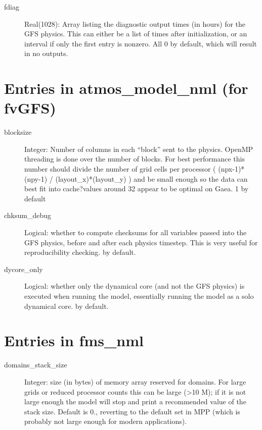 \documentclass[12pt,letterpaper]{book}
\begin{document}
\begin{description}

\item[fdiag] Real(1028): Array listing the diagnostic output times (in hours) for the GFS physics. This can either be a list of times after initialization, or an interval if only the first entry is nonzero. All 0 by default, which will result in no outputs. 

\end{description}

\section{Entries in atmos\_model\_nml (for fvGFS)}

\begin{description}

\item[blocksize] Integer: Number of columns in each ``block'' sent to the physics. OpenMP threading is done over the number of blocks. For best performance this number should divide the number of grid cells per processor ( (npx-1)*(npy-1) / (layout\_x)*(layout\_y) ) and be small enough so the data can best fit into cache?values around 32 appear to be optimal on Gaea. 1 by default

\item[chksum\_debug] Logical: whether to compute checksums for all variables passed into the GFS physics, before and after each physics timestep. This is very useful for reproducibility checking. \false  by default.

\item[dycore\_only] Logical: whether only the dynamical core (and not the GFS physics) is executed when running the model, essentially running the model as a solo dynamical core. \false  by default.

\end{description}


\section{Entries in fms\_nml}

\begin{description}

\item[domains\_stack\_size] Integer: size (in bytes) of memory array reserved for domains. For large grids or reduced processor counts this can be large (>10 M); if it is not large enough the model will stop and print a recommended value of the stack size. Default is 0., reverting to the default set in MPP (which is probably not large enough for modern applications).

\end{description}
\end{document}
